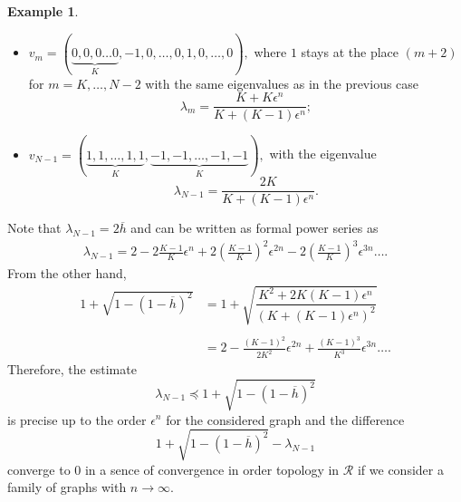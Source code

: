 \documentclass[a4paper,12pt]{amsart}
\theoremstyle{definition}
\newtheorem{example}{Example}
\newcommand{\R}{\mathcal{R}}
\begin{document}
\begin{example}
\begin{itemize}
$$$$
\item
$
v_m=(\underbrace{0,0,0\dots 0}_K,-1,0,\dots, 0,1, 0,\dots,0), 
$
where $1$ stays at the place $(m+2)$ for $m=K, \dots, N-2$
with the same eigenvalues as in the previous case
$$\lambda_m=\dfrac{K+K\epsilon^n}{K+(K-1)\epsilon^n};
$$
\item$
v_{N-1}=({\underbrace{1,1,\dots,1,1}_{K}}, {\underbrace{-1,-1,\dots,-1,-1}_{K}}),
$
with the eigenvalue $$\lambda_{N-1}=\dfrac{2K}{K+(K-1)\epsilon^n}.
$$
\end{itemize}
Note that $\lambda_{N-1}=2\overline h$ and can be written as formal power series as
\begin{align*}
\lambda_{N-1}=2-2\frac{K-1}{K}\epsilon^n+2\left(\frac{K-1}{K}\right)^2\epsilon^{2n}-2\left(\frac{K-1}{K}\right)^3\epsilon^{3n} \dots.
\end{align*}
From the other hand,
\begin{align*}
 1+\sqrt{1-(1-\overline h)^2}&=1+\sqrt{\dfrac{K^2+2K(K-1)\epsilon^n}{(K+(K-1)\epsilon^n)^2}}\\
\\
&=2-\frac{(K-1)^2}{2 K^2}\epsilon^{2n}+\frac{(K-1)^3}{K^3}\epsilon^{3n} \dots.
\end{align*}
Therefore, the estimate
$$
\lambda_{N-1}\preceq  1+\sqrt{1-(1-\overline h)^2}
$$
is precise up to the order $\epsilon^n$ for the considered graph and the difference
$$
1+\sqrt{1-(1-\overline h)^2} - \lambda_{N-1}
$$
converge to $0$ in a sence of convergence in order topology in $\R$ if we consider a family of graphs with $n\to\infty$. 

\end{example}
\end{document}
